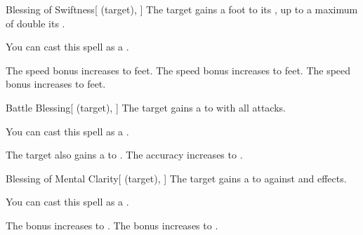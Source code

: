 \lowercase{\hypertarget{spell:Blessing of Swiftness}{}}\label{spell:Blessing of Swiftness}
\begin{attuneability}[Rank 2]{\hypertarget{spell:Blessing of Swiftness}{Blessing of Swiftness}}[ (target), ]
The target gains a  foot  to its , up to a maximum of double its .

You can cast this spell as a .

\rankline
{} The speed bonus increases to  feet.
 The speed bonus increases to  feet.
 The speed bonus increases to  feet.
\end{attuneability}
\vspace{0.25em}



\lowercase{\hypertarget{spell:Battle Blessing}{}}\label{spell:Battle Blessing}
\begin{attuneability}[Rank 3]{\hypertarget{spell:Battle Blessing}{Battle Blessing}}[ (target), ]
The target gains a   to  with all attacks.

You can cast this spell as a .

\rankline
{} The target also gains a   to .
 The accuracy increases to .
\end{attuneability}
\vspace{0.25em}



\lowercase{\hypertarget{spell:Blessing of Mental Clarity}{}}\label{spell:Blessing of Mental Clarity}
\begin{attuneability}[Rank 3]{\hypertarget{spell:Blessing of Mental Clarity}{Blessing of Mental Clarity}}[ (target), ]
The target gains a   to  against  and  effects.

You can cast this spell as a .

\rankline
{} The bonus increases to .
 The bonus increases to .
\end{attuneability}
\vspace{0.25em}




